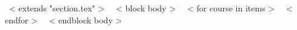 \vspace{5mm}
~< extends "section.tex" >~
~< block body >~
~< for course in items >~
~< endfor >~
~< endblock body >~
